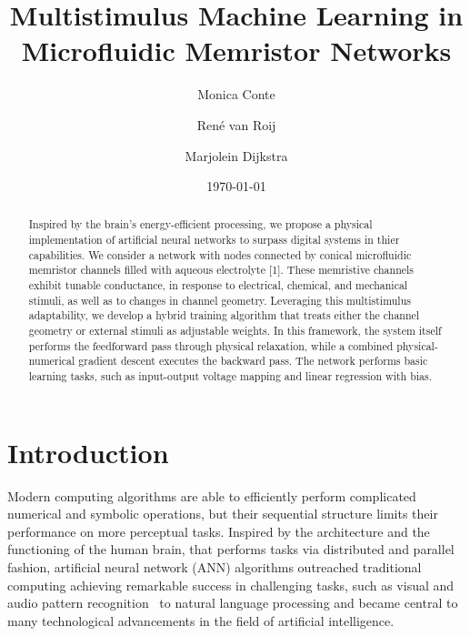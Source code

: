 \documentclass[reprint,superscriptaddress,prb,showkeys]{revtex4-2}
\begin{document}
\title{Multistimulus Machine Learning in Microfluidic Memristor Networks}

\author{Monica Conte}
\author{René van Roij}
\author{Marjolein Dijkstra}

\date{\today}

\begin{abstract}
Inspired by the brain's energy-efficient processing, we propose a physical implementation of artificial neural networks to surpass digital systems in thier capabilities. We consider a network with nodes connected by conical microfluidic memristor channels filled with aqueous electrolyte [1]. These memristive channels exhibit tunable conductance, in response to electrical, chemical, and mechanical stimuli, as well as to changes in channel geometry. Leveraging this multistimulus adaptability, we develop a hybrid training algorithm that treats either the channel geometry or external stimuli as adjustable weights. In this framework, the system itself performs the feedforward pass through physical relaxation, while a combined physical-numerical gradient descent executes the backward pass. The network performs basic learning tasks, such as input-output voltage mapping and linear regression with bias.
\end{abstract}
\maketitle

\renewcommand{\figurename}{FIG.}

\section{\label{sec:Intro}Introduction}


Modern computing algorithms are able to efficiently perform complicated numerical and symbolic operations, but their sequential structure limits their performance on more perceptual tasks. Inspired by the architecture and the functioning of the human brain, that performs tasks via distributed and parallel fashion, artificial neural network (ANN) algorithms outreached traditional computing achieving remarkable success in challenging tasks, such as visual and audio pattern recognition~\cite{pattern_recognition,review_image_rec, speech_rec} to natural language processing and became central to many technological advancements in the field of artificial intelligence\cite{ai_tech1}.
\end{document}
